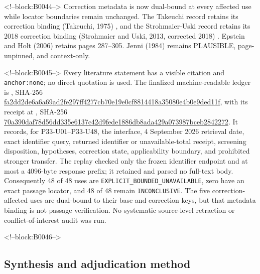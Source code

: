 \documentclass[11pt,a4paper]{article}
\begin{document}
<!--block:B0044-->
Correction metadata is now dual-bound at every affected use while locator boundaries remain unchanged. The Takeuchi record retains its correction binding (Takeuchi, 1975)
\citep{P33-S03,P33-S03-CORR}
, and the Strohmaier-Uski record retains its 2018 correction binding (Strohmaier and Uski, 2013, corrected 2018)
\citep{P33-S16,P33-S16-CORR}
. Epstein and Holt (2006)
\citep{P33-S12}
 retains pages 287--305. Jenni (1984)
\citep{P33-S06}
 remains PLAUSIBLE, page-unpinned, and context-only.

<!--block:B0045-->
Every literature statement has a visible citation and \texttt{anchor:none}; no direct quotation is used. The finalized machine-readable ledger is , SHA-256 \url{fa2dd2de6a6a69ad2fe297ff4277cb70e19e0cf8814418a35080e4b0e9ded11f}, with its receipt at , SHA-256 \url{70a390daf78d56dd335e6137c42d9fede1886db8ada429a073987bceb2842272}. It records, for P33-U01--P33-U48, the interface, 4 September 2026 retrieval date, exact identifier query, returned identifier or unavailable-total receipt, screening disposition, hypotheses, correction state, applicability boundary, and prohibited stronger transfer. The replay checked only the frozen identifier endpoint and at most a 4096-byte response prefix; it retained and parsed no full-text body. Consequently 48 of 48 uses are \texttt{EXPLICIT\_BOUNDED\_UNAVAILABLE}, zero have an exact passage locator, and 48 of 48 remain \texttt{INCONCLUSIVE}. The five correction-affected uses are dual-bound to their base and correction keys, but that metadata binding is not passage verification. No systematic source-level retraction or conflict-of-interest audit was run.

<!--block:B0046-->
\hypertarget{synthesis-and-adjudication-method}{%
\subsection{Synthesis and adjudication method}\label{synthesis-and-adjudication-method}}
\end{document}
